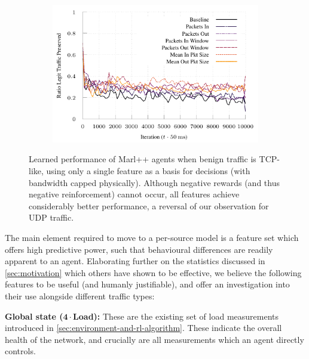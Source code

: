 \documentclass[conference, letterpaper, 10pt, times]{IEEEtran}
\newcommand{\fakepara}[1]{\noindent\textbf{#1:}}
\begin{document}
\begin{figure}
\begin{subfigure}{0.32\linewidth}
	\end{subfigure}
	\begin{subfigure}{0.32\linewidth}
		\includegraphics[width=\linewidth]{../plots/ftprep-tcp-cap-good-3}
	\end{subfigure}
	
	\caption{
		Learned performance of Marl++ agents when benign traffic is TCP-like, using only a single feature as a basis for decisions (with bandwidth capped physically).
		Although negative rewards (and thus negative reinforcement) cannot occur, all features achieve considerably better performance, a reversal of our observation for UDP traffic.
		\label{fig:tcp-cap-feature-plots}
	}
\end{figure}

The main element required to move to a per-source model is a feature set which offers high predictive power, such that behavioural differences are readily apparent to an agent.
Elaborating further on the statistics discussed in \cref{sec:motivation} which others have shown to be effective, we believe the following features to be useful (and humanly justifiable), and offer an investigation into their use alongside different traffic types:

\fakepara{Global state ($\mathbf{4\cdot{}}$Load)}
These are the existing set of load measurements introduced in \cref{sec:environment-and-rl-algorithm}.
These indicate the overall health of the network, and crucially are all measurements which an agent directly controls.
\end{document}

